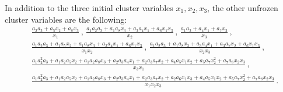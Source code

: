 \documentclass[11pt]{amsart}
\begin{document}
In addition to the three initial cluster variables $x_1,x_2,x_3$, the other unfrozen cluster variables are the following: 
\begin{align*}
& \frac{a_2  a_3 +  a_5  x_2 +  a_8  x_3}{ x_1}
 \, , \, 
   \frac{ a_1  a_2  a_3 +  a_1  a_8  x_3 +  a_3  a_4  x_1 +  a_6  x_1  x_3}{ x_2} 
  \, , \, 
 \frac{a_1  a_2 +  a_4  x_1 +  a_7  x_2}{ x_3}   \, , \, \\
  &
   \frac{ a_1  a_2  a_3 +  a_1  a_5  x_2 +  a_1  a_8  x_3 +  a_3  a_4  x_1 +  a_6  x_1  x_3}{ x_1  x_2}
  \, , \,  
    \frac{ a_1  a_2  a_3 +  a_1  a_8  x_3 +  a_3  a_4  x_1 +  a_3  a_7  x_2 +  a_6  x_1  x_3}{ x_2  x_3} 
    \, , \, \\
    &  
           \frac{ a_1  a_2^2  a_3 +  a_1  a_2  a_5  x_2 +  a_1  a_2  a_8  x_3 +  a_2  a_3  a_4  x_1 +  a_2  a_3  a_7  x_2 +  a_4  a_5  x_1  x_2 +  a_5  a_7  x_2^2 +  a_7  a_8  x_2  x_3}{ x_3  x_1}              \, , \,
 \\
& 
\frac{ a_1  a_2^2  a_3 +  a_1  a_2  a_5  x_2 +  a_1  a_2  a_8  x_3 +  a_2  a_3  a_4  x_1 +  a_2  a_3  a_7  x_2 +  a_2  a_6  x_1  x_3 +  a_4  a_5  x_1  x_2 +  a_5  a_7  x_2^2 +  a_7  a_8  x_2  x_3}{ x_1  x_2  x_3}\, .
\end{align*}
\end{document}
